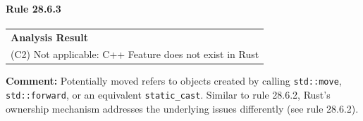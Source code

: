 \paragraph{Rule 28.6.3}
\begin{longtable}{p{13cm}}
\textbf{Analysis Result} \\
(C2) Not applicable: C++ Feature does not exist in Rust \\
\end{longtable}
\textbf{Comment:} Potentially moved refers to objects created by calling \texttt{std::move}, \texttt{std::forward}, or an equivalent \texttt{static\_cast}. Similar to rule 28.6.2, Rust's ownership mechanism addresses the underlying issues differently (see rule 28.6.2). \\
